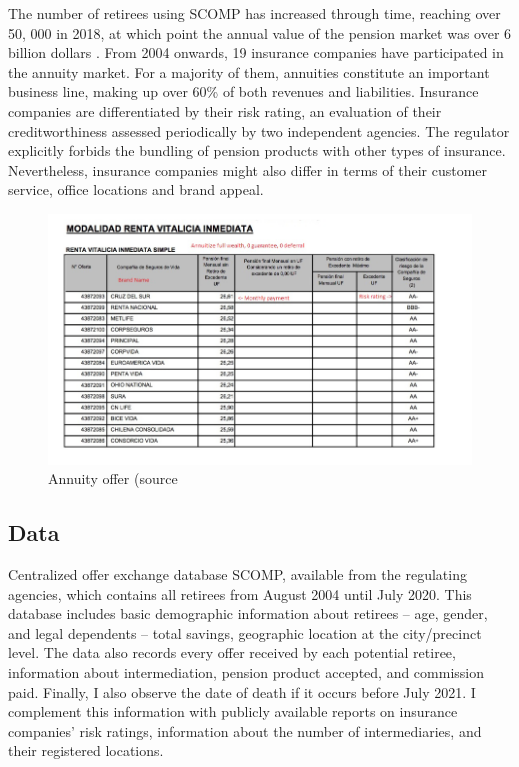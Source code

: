 \documentclass[12pt]{article}
\theoremstyle{plain}
\theoremstyle{plain}
\begin{document}
The number of retirees using SCOMP has increased through time, reaching over 50, 000 in 2018, at which point the annual value of the pension market was over 6 billion dollars . From 2004 onwards, 19 insurance companies have participated in the annuity market. For a majority of them, annuities constitute an important business line, making up over 60\% of both revenues and liabilities. Insurance companies are differentiated by their risk rating, an evaluation of their creditworthiness assessed periodically by two independent agencies. The regulator explicitly forbids the bundling of pension products with other types of insurance. Nevertheless, insurance companies might also differ in terms of their customer service, office locations and brand appeal.

\begin{figure}
    \centering
    \includegraphics[width=0.85\linewidth]{figures/annuity_offer.png}
    \caption{Annuity offer (source \textcite{illanes_retirement_2019}}
    \label{fig:offer_ann1}
\end{figure}



\subsection*{Data}

Centralized offer exchange database SCOMP, available from the regulating agencies, which contains all retirees from August 2004 until July 2020. This database includes basic demographic information about retirees – age, gender, and legal dependents – total savings, geographic location at the city/precinct level. The data also records every offer received by each potential retiree, information about intermediation, pension product accepted, and commission paid. Finally, I also observe the date of death if it occurs before July 2021. I complement this information with publicly available reports on insurance companies’ risk ratings, information about the number of intermediaries, and their registered locations. 
\end{document}
